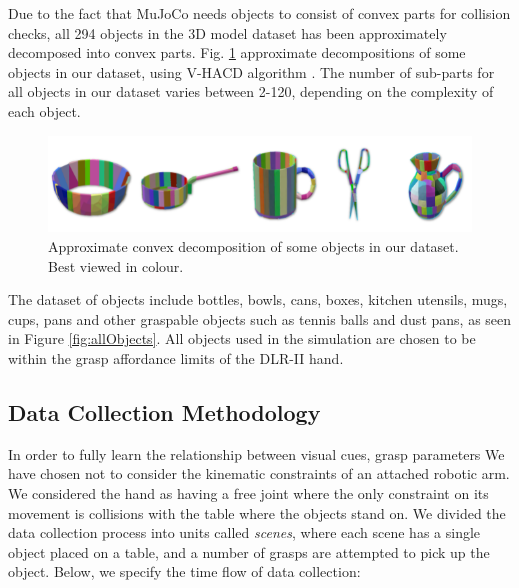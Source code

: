 Due to the fact that MuJoCo needs objects to consist of convex parts for collision checks, all 294 objects in the 3D model dataset has been approximately decomposed into convex parts. Fig. \ref{fig:objectDecomposition} approximate decompositions of some objects in our dataset, using V-HACD algorithm \cite{V-HACD}. The number of sub-parts for all objects in our dataset varies between 2-120, depending on the complexity of each object. 

\begin{figure}
  \includegraphics[width=\linewidth]{images/decomposition.png}
  \caption{Approximate convex decomposition of some objects in our dataset. Best viewed in colour.}
  \label{fig:objectDecomposition}
\end{figure}

The dataset of objects include bottles, bowls, cans, boxes, kitchen utensils, mugs, cups, pans and other graspable objects such as tennis balls and dust pans, as seen in Figure \ref{fig:allObjects}. All objects used in the simulation are chosen to be within the grasp affordance limits of the DLR-II hand. 

\subsection{Data Collection Methodology}
\label{subsection:dataCollection}

In order to fully learn the relationship between visual cues, grasp parameters We have chosen not to consider the kinematic constraints of an attached robotic arm. We considered the hand as having a free joint where the only constraint on its movement is collisions with the table where the objects stand on. We divided the data collection process into units called \textit{scenes}, where each scene has a single object placed on a table, and a number of grasps are attempted to pick up the object. Below, we specify the time flow of data collection:


